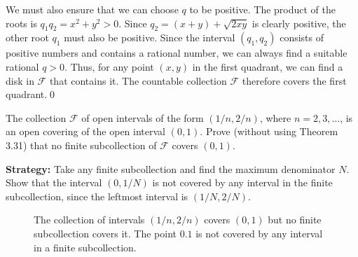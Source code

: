 We must also ensure that we can choose $q$ to be positive. The product of the roots is $q_1 q_2 = x^2+y^2 > 0$. Since $q_2 = (x+y) + \sqrt{2xy}$ is clearly positive, the other root $q_1$ must also be positive.
Since the interval $(q_1, q_2)$ consists of positive numbers and contains a rational number, we can always find a suitable rational $q > 0$.
Thus, for any point $(x,y)$ in the first quadrant, we can find a disk in $\mathcal{F}$ that contains it. The countable collection $\mathcal{F}$ therefore covers the first quadrant.\qed


\begin{problembox}
The collection \( \mathcal{F} \) of open intervals of the form \( (1/n, 2/n) \), where \( n = 2, 3, \ldots \), is an open covering of the open interval \( (0, 1) \). Prove (without using Theorem 3.31) that no finite subcollection of \( \mathcal{F} \) covers \( (0, 1) \).
\end{problembox}

\noindent\textbf{Strategy:} Take any finite subcollection and find the maximum denominator $N$. Show that the interval $(0, 1/N)$ is not covered by any interval in the finite subcollection, since the leftmost interval is $(1/N, 2/N)$.

\begin{figure}[h]
\centering
{}
\caption{The collection of intervals $(1/n, 2/n)$ covers $(0,1)$ but no finite subcollection covers it. The point $0.1$ is not covered by any interval in a finite subcollection.}
\end{figure}


